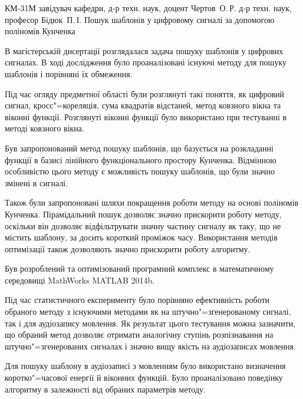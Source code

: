 \documentclass{thesis_utf8}
\begin{document}
    {КМ-31М}
    {завідувач кафедри, д-р техн. наук, доцент Чертов~О.\,Р.}
    {д-р техн. наук, професор Бідюк~П.\,І.}
    {Пошук шаблонів у цифровому сигналі за допомогою поліномів Кунченка}
\pagestyle{plain}

\tableofcontents









\conclusion{}
В магістерській дисертації розглядалася задача пошуку шаблонів у цифрових сигналах.
В ході дослідження було проаналізовані існуючі методу для пошуку шаблонів і порівняні їх обмеження.

Під час огляду предметної області були розглянуті такі поняття, як цифровий сигнал, кросс"=кореляція, сума квадратів
відстаней, метод ковзного вікна та віконні функції.
Розглянуті віконні функції було використано при тестуванні в методі ковзного вікна.

Був запропонований метод пошуку шаблонів, що базується на розкладанні функції в базисі лінійного функціонального
простору Кунченка.
Відмінною особливістю цього методу є можливість пошуку шаблонів, що були значно змінені в сигналі.

Також були запропоновані шляхи покращення роботи методу на основі поліномів Кунченка.
Пірамідальний пошук дозволяє значно прискорити роботу методу, оскільки він дозволяє відфільтрувати значну частину
сигналу як таку, що не містить шаблону, за досить короткий проміжок часу.
Використання методів оптимізації також дозволяють значно прискорити роботу алгоритму.

Був розроблений та оптимізований програмний комплекс в математичному середовищі MathWorks MATLAB 2014b.

Під час статистичного експерименту було порівняно ефективність роботи обраного методу з існуючими методами як на
штучно"=згенерованому сигналі, так і для аудіозапису мовлення.
Як результат цього тестування можна зазначити, що обраний метод дозволяє отримати аналогічну ступінь розпізнавання на
штучно"=згенерованих сигналах і значно вищу якість на аудіозаписах мовлення.

Для пошуку шаблону в аудіозаписі з мовленням було використано визначення коротко"=часової енергії й віконних функцій.
Було проаналізовано поведінку алгоритму в залежності від обраних параметрів методу.
\end{document}

